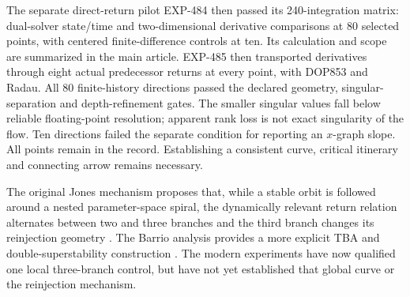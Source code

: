 The separate direct-return pilot EXP-484 then passed its 240-integration
matrix: dual-solver state/time and two-dimensional derivative comparisons
at 80 selected points, with centered finite-difference controls at ten.
Its calculation and scope are summarized in the main article. EXP-485 then
transported derivatives through eight actual predecessor returns at every
point, with DOP853 and Radau. All 80 finite-history directions passed the
declared geometry, singular-separation and depth-refinement gates. The
smaller singular values fall below reliable floating-point resolution;
apparent rank loss is not exact singularity of the flow. Ten directions
failed the separate condition for reporting an $x$-graph slope. All points
remain in the record. Establishing a consistent curve, critical itinerary
and connecting arrow remains necessary.


The original Jones mechanism proposes that, while a stable orbit is followed
around a nested parameter-space spiral, the dynamically relevant return
relation alternates between two and three branches and the third branch changes
its reinjection geometry \citep{jones2012topological}.  The Barrio analysis
provides a more explicit TBA and double-superstability construction
\citep{barrio2012topological}.  The modern experiments have now qualified one
local three-branch control, but have not yet established that global curve or
the reinjection mechanism.

